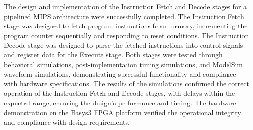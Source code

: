 \documentclass[CMPE]{../KGCOEReport}
\begin{document}
The design and implementation of the Instruction Fetch and Decode stages for a pipelined MIPS architecture were successfully completed. The Instruction Fetch stage was designed to fetch program instructions from memory, incrementing the program counter sequentially and responding to reset conditions. The Instruction Decode stage was designed to parse the fetched instructions into control signals and register data for the Execute stage. Both stages were tested through behavioral simulations, post-implementation timing simulations, and ModelSim waveform simulations, demonstrating successful functionality and compliance with hardware specifications. The results of the simulations confirmed the correct operation of the Instruction Fetch and Decode stages, with delays within the expected range, ensuring the design's performance and timing. The hardware demonstration on the Basys3 FPGA platform verified the operational integrity and compliance with design requirements.

\newpage

\end{document}
